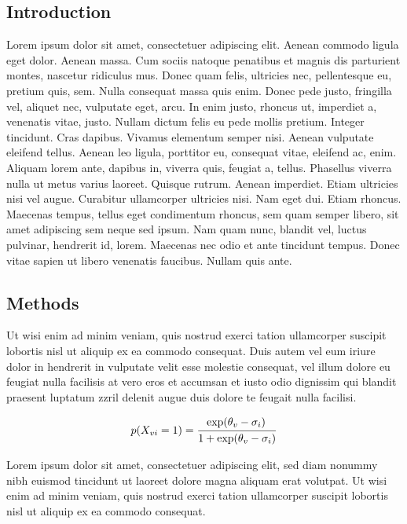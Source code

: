 \documentclass[a1paper, english]{article}
\begin{document}
\begin{posterbox}
	\vspace{-10mm}
	\raggedright

	\section*{Introduction}
	Lorem ipsum dolor sit amet, consectetuer adipiscing elit. Aenean commodo ligula eget dolor. Aenean massa. Cum sociis natoque penatibus et magnis dis parturient montes, nascetur ridiculus mus. Donec quam felis, ultricies nec, pellentesque eu, pretium quis, sem. Nulla consequat massa quis enim. Donec pede justo, fringilla vel, aliquet nec, vulputate eget, arcu. In enim justo, rhoncus ut, imperdiet a, venenatis vitae, justo. Nullam dictum felis eu pede mollis pretium. Integer tincidunt. Cras dapibus. Vivamus elementum semper nisi. Aenean vulputate eleifend tellus. Aenean leo ligula, porttitor eu, consequat vitae, eleifend ac, enim. Aliquam lorem ante, dapibus in, viverra quis, feugiat a, tellus. Phasellus viverra nulla ut metus varius laoreet. Quisque rutrum. Aenean imperdiet. Etiam ultricies nisi vel augue. Curabitur ullamcorper ultricies nisi. Nam eget dui. Etiam rhoncus. Maecenas tempus, tellus eget condimentum rhoncus, sem quam semper libero, sit amet adipiscing sem neque sed ipsum. Nam quam nunc, blandit vel, luctus pulvinar, hendrerit id, lorem. Maecenas nec odio et ante tincidunt tempus. Donec vitae sapien ut libero venenatis faucibus. Nullam quis ante.
\end{posterbox}

\vfill

\begin{posterbox}
	\vspace{-10mm}
	\raggedright

	\section*{Methods}
	Ut wisi enim ad minim veniam, quis nostrud exerci tation ullamcorper suscipit lobortis nisl ut aliquip ex ea commodo consequat. Duis autem vel eum iriure dolor in hendrerit in vulputate velit esse molestie consequat, vel illum dolore eu feugiat nulla facilisis at vero eros et accumsan et iusto odio dignissim qui blandit praesent luptatum zzril delenit augue duis dolore te feugait nulla facilisi.

	$$
	 p\!\left(X_{vi} = 1\right) = \frac{\exp\!\left(\theta_v - \sigma_i\right)\strut}
	 {\strut 1 + \exp\!\left(
	 \theta_v - \sigma_i\right)}
	$$

	Lorem ipsum dolor sit amet, consectetuer adipiscing elit, sed diam nonummy nibh euismod tincidunt ut laoreet dolore magna aliquam erat volutpat. Ut wisi enim ad minim veniam, quis nostrud exerci tation ullamcorper suscipit lobortis nisl ut aliquip ex ea commodo consequat.
\end{posterbox}
\end{document}
